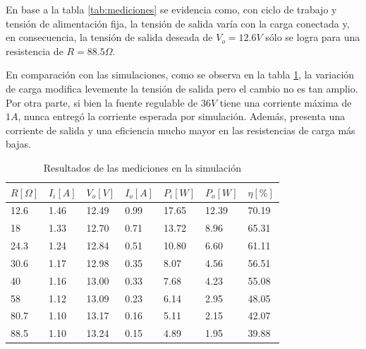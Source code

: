 
En base a la tabla \ref{tab:mediciones} se evidencia como, con ciclo de trabajo y tensión de alimentación fija, la tensión de salida varía con la carga conectada y, en consecuencia, la tensión de salida deseada de $V_{o}=12.6V$ sólo se logra para una resistencia de $R=88.5\Omega$.


En comparación con las simulaciones, como se observa en la tabla \ref{tab:mediciones_sim}, la variación de carga modifica levemente la tensión de salida pero el cambio no es tan amplio.
Por otra parte, si bien la fuente regulable de $36V$ tiene una corriente máxima de $1A$, nunca entregó la corriente esperada por simulación. 
Además, presenta una corriente de salida y una eficiencia mucho mayor en las resistencias de carga más bajas. 

\begin{table}[H]
    \centering
    \begin{tabular}{lllllll}
    \hline
    $R[\Omega]$ & $I_i[A]$ & $V_o[V]$ & $I_o[A]$ & \multicolumn{1}{c}{$P_i[W]$} & \multicolumn{1}{c}{$P_o[W]$} & \multicolumn{1}{c}{$\eta[\%]$} \\ \hline
    12.6        & 1.46     & 12.49    & 0.99     & 17.65                        & 12.39                        & 70.19                          \\
    18          & 1.33     & 12.70    & 0.71     & 13.72                        & 8.96                         & 65.31                          \\
    24.3        & 1.24     & 12.84    & 0.51     & 10.80                        & 6.60                         & 61.11                          \\
    30.6        & 1.17     & 12.98    & 0.35     & 8.07                         & 4.56                         & 56.51                          \\
    40          & 1.16     & 13.00    & 0.33     & 7.68                         & 4.23                         & 55.08                          \\
    58          & 1.12     & 13.09    & 0.23     & 6.14                         & 2.95                         & 48.05                          \\
    80.7        & 1.10     & 13.17    & 0.16     & 5.11                         & 2.15                         & 42.07                          \\
    88.5        & 1.10     & 13.24    & 0.15     & 4.89                         & 1.95                         & 39.88                          \\ \hline
    \end{tabular}
    \caption{Resultados de las mediciones en la simulación}
    \label{tab:mediciones_sim}
\end{table}

